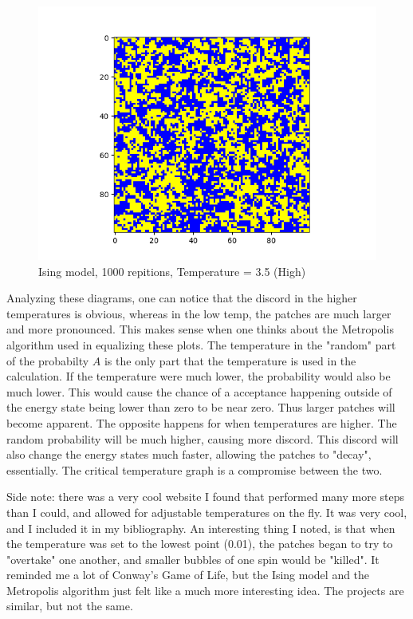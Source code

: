 \documentclass[12pt]{article}
\begin{document}
\begin{figure}[H]
\begin{center}
\includegraphics[scale=0.6]{high_temp.png}
\caption{Ising model, 1000 repitions, Temperature = 3.5 (High)}
\end{center}
\end{figure}

Analyzing these diagrams, one can notice that the discord in the higher temperatures is obvious, whereas in the low temp, the patches are much larger and more pronounced. This makes sense when one thinks about the Metropolis algorithm used in equalizing these plots. The temperature in the "random" part of the probabilty $A$ is the only part that the temperature is used in the calculation. If the temperature were much lower, the probability would also be much lower. This would cause the chance of a acceptance happening outside of the energy state being lower than zero to be near zero. Thus larger patches will become apparent. The opposite happens for when temperatures are higher. The random probability will be much higher, causing more discord. This discord will also change the energy states much faster, allowing the patches to "decay", essentially. The critical temperature graph is a compromise between the two.


Side note: there was a very cool website I found that performed many more steps than I could, and allowed for adjustable temperatures on the fly. It was very cool, and I included it in my bibliography. An interesting thing I noted, is that when the temperature was set to the lowest point (0.01), the patches began to try to "overtake" one another, and smaller bubbles of one spin would be "killed". It reminded me a lot of Conway's Game of Life, but the Ising model and the Metropolis algorithm just felt like a much more interesting idea. The projects are similar, but not the same.
\end{document}

